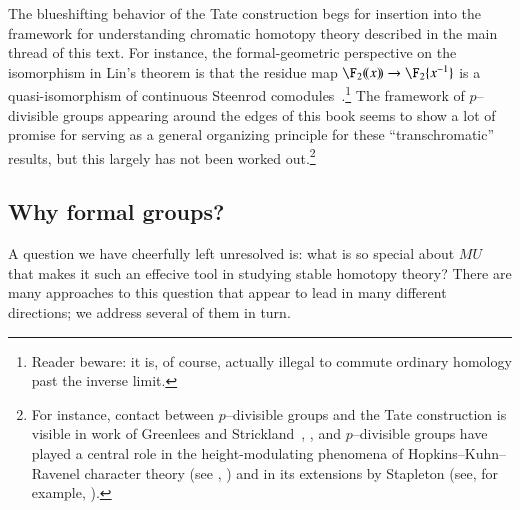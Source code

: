 The blueshifting behavior of the Tate construction begs for insertion into the framework for understanding chromatic homotopy theory described in the main thread of this text.  For instance, the formal-geometric perspective on the isomorphism in Lin's theorem is that the residue map $\F_2(\!(x)\!) \to \F_2\{x^{-1}\}$ is a quasi-isomorphism of continuous Steenrod comodules~\cite[Remark 8.34]{StricklandFSFG}.\footnote{Reader beware: it is, of course, actually illegal to commute ordinary homology past the inverse limit.}  The framework of $p$--divisible groups appearing around the edges of this book seems to show a lot of promise for serving as a general organizing principle for these ``transchromatic'' results, but this largely has not been worked out.\footnote{For instance, contact between $p$--divisible groups and the Tate construction is visible in work of Greenlees and Strickland~\cite{GreenleesStrickland}, \cite[pg.\ 10]{StricklandFPFP}, and $p$--divisible groups have played a central role in the height-modulating phenomena of Hopkins--Kuhn--Ravenel character theory (see , \cite{HKR}) and in its extensions by Stapleton (see, for example, \cite{Stapleton}).}






\subsection*{Why formal groups?}

A question we have cheerfully left unresolved is: what is so special about $MU$ that makes it such an effecive tool in studying stable homotopy theory?  There are many approaches to this question that appear to lead in many different directions; we address several of them in turn.

